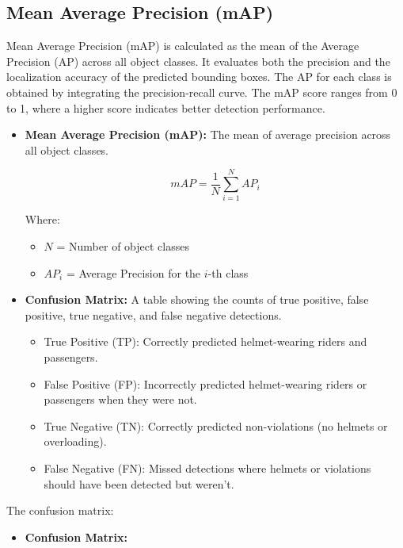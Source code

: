 \begin{refsection}
\section*{Mean Average Precision (mAP)}


Mean Average Precision (mAP) is calculated as the mean of the Average Precision (AP) across all object classes. It evaluates both the precision and the localization accuracy of the predicted bounding boxes. The AP for each class is obtained by integrating the precision-recall curve.
The mAP score ranges from 0 to 1, where a higher score indicates better detection performance.


\begin{itemize}
    \item \textbf{Mean Average Precision (mAP):} The mean of average precision across all object classes.
   
    \begin{equation}
        mAP = \frac{1}{N} \sum_{i=1}^{N} AP_i
        \label{eq:map}
    \end{equation}


    Where:
    \begin{itemize}
        \item $N$ = Number of object classes
        \item $AP_i$ = Average Precision for the $i$-th class
    \end{itemize}


    \item \textbf{Confusion Matrix:} A table showing the counts of true positive, false positive, true negative, and false negative detections.
    \begin{itemize}
        \item {True Positive (TP):} Correctly predicted helmet-wearing riders and passengers.
        \item {False Positive (FP):} Incorrectly predicted helmet-wearing riders or passengers when they were not.
        \item {True Negative (TN):} Correctly predicted non-violations (no helmets or overloading).
        \item {False Negative (FN):} Missed detections where helmets or violations should have been detected but weren’t.
    \end{itemize}
\end{itemize}


The confusion matrix:


\begin{itemize}
    \item \textbf{Confusion Matrix:}



\end{itemize}
\end{refsection}
